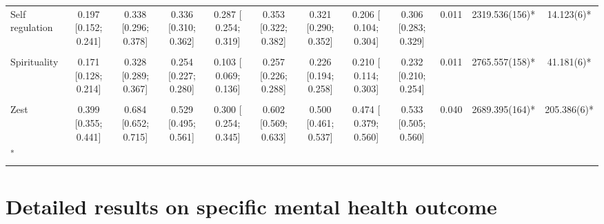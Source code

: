 \documentclass[
  letterpaper,
  DIV=11,
  numbers=noendperiod]{scrartcl}
\begin{document}
\begin{table}[H]
{\begin{tabular}[t]{lccccccccccc}
Self regulation & 0.197 [0.152; 0.241] & 0.338 [0.296; 0.378] & 0.336 [0.310; 0.362] & 0.287 [ 0.254; 0.319] & 0.353 [0.322; 0.382] & 0.321 [0.290; 0.352] & 0.206 [ 0.104; 0.304] & 0.306 [0.283; 0.329] & 0.011 & 2319.536(156)* & 14.123(6)*\\
\addlinespace
{} &  &  &  &  &  &  &  &  &  &  & \\
Spirituality & 0.171 [0.128; 0.214] & 0.328 [0.289; 0.367] & 0.254 [0.227; 0.280] & 0.103 [ 0.069; 0.136] & 0.257 [0.226; 0.288] & 0.226 [0.194; 0.258] & 0.210 [ 0.114; 0.303] & 0.232 [0.210; 0.254] & 0.011 & 2765.557(158)* & 41.181(6)*\\
 &  &  &  &  &  &  &  &  &  &  & \\
Zest & 0.399 [0.355; 0.441] & 0.684 [0.652; 0.715] & 0.529 [0.495; 0.561] & 0.300 [ 0.254; 0.345] & 0.602 [0.569; 0.633] & 0.500 [0.461; 0.537] & 0.474 [ 0.379; 0.560] & 0.533 [0.505; 0.560] & 0.040 & 2689.395(164)* & 205.386(6)*\\
\bottomrule
{}\\
\end{tabular}}
\end{table}

\hypertarget{detailed-results-on-specific-mental-health-outcome}{%
\section{Detailed results on specific mental health
outcome}\label{detailed-results-on-specific-mental-health-outcome}}
\end{document}
